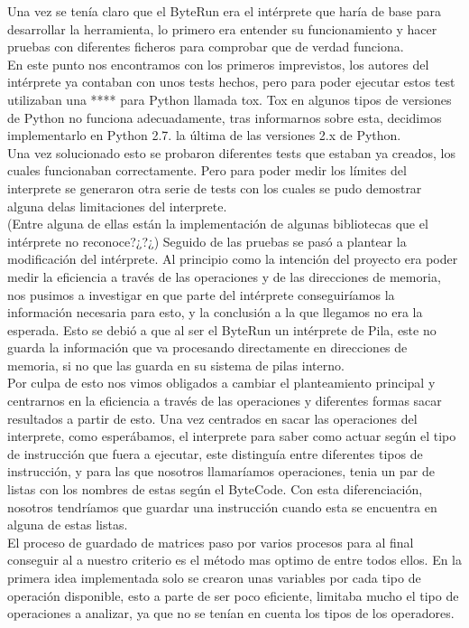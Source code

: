 	
Una vez se tenía claro que el ByteRun era el intérprete que haría de base para desarrollar la herramienta, lo primero era entender su funcionamiento y hacer pruebas con diferentes ficheros para comprobar que de verdad funciona.\\
En este punto nos encontramos con los primeros imprevistos, los autores del intérprete ya contaban con unos tests hechos, pero para poder ejecutar estos test utilizaban una **** para Python llamada tox. Tox en algunos tipos de versiones de Python no funciona adecuadamente, tras informarnos sobre esta, decidimos implementarlo en Python 2.7. la última de las versiones 2.x de Python.\\
Una vez solucionado esto se probaron diferentes tests que estaban ya creados, los cuales funcionaban correctamente. Pero para poder medir los límites del interprete se generaron otra serie de tests con los cuales se pudo demostrar alguna delas limitaciones del interprete.\\
(Entre alguna de ellas están la implementación de algunas bibliotecas que el intérprete no reconoce?¿?¿)
Seguido de las pruebas se pasó a plantear la modificación del intérprete. Al principio como la intención del proyecto era poder medir la eficiencia a través de las operaciones y de las direcciones de memoria, nos pusimos a investigar en que parte del intérprete conseguiríamos la información necesaria para esto, y la conclusión a la que llegamos no era la esperada. Esto se debió a que al ser el ByteRun un intérprete de Pila, este no guarda la información que va procesando directamente en direcciones de memoria, si no que las guarda en su sistema de pilas interno. \\
Por culpa de esto nos vimos obligados a cambiar el planteamiento principal y centrarnos en la eficiencia a través de las operaciones y diferentes formas sacar resultados a partir de esto.
Una vez centrados en sacar las operaciones del interprete, como esperábamos, el interprete para saber como actuar según el tipo de instrucción que fuera a ejecutar, este distinguía entre diferentes tipos de instrucción, y para las que nosotros llamaríamos operaciones, tenia un par de listas con los nombres de estas según el ByteCode. Con esta diferenciación, nosotros tendríamos que guardar una instrucción cuando esta se encuentra en alguna de estas listas. \\
El proceso de guardado de matrices paso por varios procesos para al final conseguir al a nuestro criterio es el método mas optimo de entre todos ellos.
En la primera idea implementada solo se crearon unas variables por cada tipo de operación disponible, esto a parte de ser poco eficiente, limitaba mucho el tipo de operaciones a analizar, ya que no se tenían en cuenta los tipos de los operadores.\\
